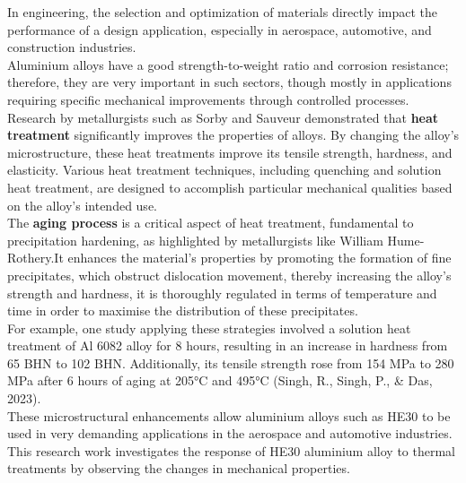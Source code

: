 \documentclass{article}
\begin{document}
    In engineering, the selection and optimization of materials directly impact the performance of a design application, especially in aerospace, automotive, and construction industries.\\[8pt] 
    Aluminium alloys have a good strength-to-weight ratio and corrosion resistance; therefore, they are very important in such sectors, though mostly in applications requiring specific mechanical improvements through controlled processes. \\[8pt] 
    Research by metallurgists such as Sorby and Sauveur demonstrated that \textbf{heat treatment} significantly improves the properties of alloys. By changing the alloy's microstructure, these heat treatments improve its tensile strength, hardness, and elasticity. Various heat treatment techniques, including quenching and solution heat treatment, are designed to accomplish particular mechanical qualities based on the alloy's intended use.\\[8pt] 
    The \textbf{aging process} is a critical aspect of heat treatment, fundamental to precipitation hardening, as highlighted by metallurgists like William Hume-Rothery.It enhances the material's properties by promoting the formation of fine precipitates, which obstruct dislocation movement, thereby increasing the alloy's strength and hardness, it is thoroughly regulated in terms of temperature and time in order to maximise the distribution of these precipitates.\\[8pt] 
    For example, one study applying these strategies involved a solution heat treatment of Al 6082 alloy for 8 hours, resulting in an increase in hardness from 65 BHN to 102 BHN. Additionally, its tensile strength rose from 154 MPa to 280 MPa after 6 hours of aging at 205°C and 495°C (Singh, R., Singh, P., \& Das, 2023). \\[8pt] 
    These microstructural enhancements allow aluminium alloys such as HE30 to be used in very demanding applications in the aerospace and automotive industries.\\[8pt] 
    This research work investigates the response of HE30 aluminium alloy to thermal treatments by observing the changes in mechanical properties.  
            
    \newpage\vspace*{-20pt}
\end{document}
